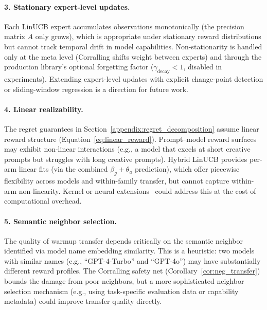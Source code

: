 \paragraph{3. Stationary expert-level updates.}
Each LinUCB expert accumulates observations monotonically (the precision
matrix $A$ only grows), which is appropriate under stationary reward
distributions but cannot track temporal drift in model capabilities.
Non-stationarity is handled only at the meta level (Corralling shifts weight
between experts) and through the production library's optional forgetting
factor ($\gamma_{\text{decay}} < 1$, disabled in experiments).  Extending
expert-level updates with explicit change-point detection or sliding-window
regression is a direction for future work.

\paragraph{4. Linear realizability.}
The regret guarantees in Section~\ref{appendix:regret_decomposition} assume
linear reward structure (Equation~\ref{eq:linear_reward}).  Prompt--model
reward surfaces may exhibit non-linear interactions (e.g., a model that excels
at short creative prompts but struggles with long creative prompts).  Hybrid
LinUCB provides per-arm linear fits (via the combined
$\beta_g + \theta_a$ prediction), which offer piecewise flexibility across
models and within-family transfer, but cannot capture within-arm
non-linearity.  Kernel or neural extensions~\cite{zhou2020neural} could
address this at the cost of computational overhead.

\paragraph{5. Semantic neighbor selection.}
The quality of warmup transfer depends critically on the semantic neighbor
identified via model name embedding similarity.  This is a heuristic: two
models with similar names (e.g., ``GPT-4-Turbo'' and ``GPT-4o'') may have
substantially different reward profiles.  The Corralling safety net
(Corollary~\ref{cor:neg_transfer}) bounds the damage from poor neighbors, but
a more sophisticated neighbor selection mechanism (e.g., using task-specific
evaluation data or capability metadata) could improve transfer quality
directly.
